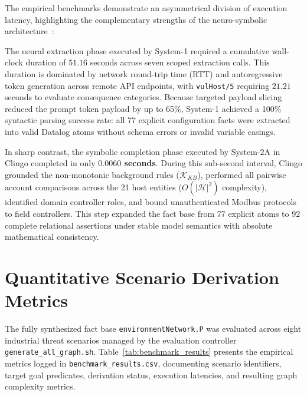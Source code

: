 \documentclass[target=mst,aauheader=aics,style=]{thud}
\begin{document}
The empirical benchmarks demonstrate an asymmetrical division of execution latency, highlighting the complementary strengths of the neuro-symbolic architecture~\cite{alviano2025llmasp}:

The neural extraction phase executed by System-1 required a cumulative wall-clock duration of $51.16$ seconds across seven scoped extraction calls. This duration is dominated by network round-trip time (RTT) and autoregressive token generation across remote API endpoints, with \texttt{vulHost/5} requiring $21.21$ seconds to evaluate consequence categories. Because targeted payload slicing reduced the prompt token payload by up to 65\%, System-1 achieved a 100\% syntactic parsing success rate: all 77 explicit configuration facts were extracted into valid Datalog atoms without schema errors or invalid variable casings.

In sharp contrast, the symbolic completion phase executed by System-2A in Clingo completed in only \textbf{$0.0060$ seconds}. During this sub-second interval, Clingo grounded the non-monotonic background rules ($\mathcal{K}_{KB}$), performed all pairwise account comparisons across the 21 host entities ($O(|\mathcal{H}|^2)$ complexity), identified domain controller roles, and bound unauthenticated Modbus protocols to field controllers. This step expanded the fact base from 77 explicit atoms to 92 complete relational assertions under stable model semantics with absolute mathematical consistency.
\section{Quantitative Scenario Derivation Metrics}
\label{sec:scenario_metrics}

The fully synthesized fact base \texttt{environmentNetwork.P} was evaluated across eight industrial threat scenarios managed by the evaluation controller \texttt{generate\_all\_graph.sh}. Table~\ref{tab:benchmark_results} presents the empirical metrics logged in \texttt{benchmark\_results.csv}, documenting scenario identifiers, target goal predicates, derivation status, execution latencies, and resulting graph complexity metrics.
\end{document}
